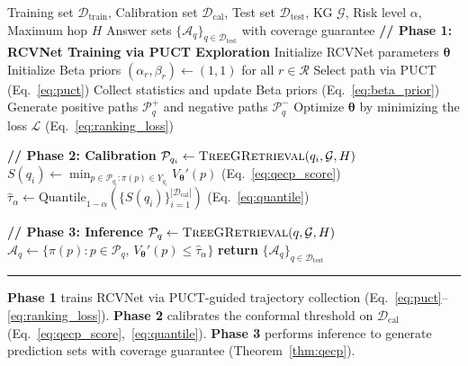 \documentclass{article}
\theoremstyle{plain}
\theoremstyle{definition}
\theoremstyle{remark}
\begin{document}
\begin{algorithm}[h]
\caption{Conformal Path Reasoning (CPR)}
\label{alg:cpr}
\begin{algorithmic}[1]
\renewcommand{\algorithmicrequire}{\textbf{Input:}} 
\renewcommand{\algorithmicensure}{\textbf{Output:}} 
\REQUIRE Training set $\mathcal{D}_{\text{train}}$, Calibration set $\mathcal{D}_{\text{cal}}$, Test set $\mathcal{D}_{\text{test}}$, 
KG $\mathcal{G}$,
Risk level $\alpha$, Maximum hop $H$
\ENSURE Answer sets $\{\mathcal{A}_q\}_{q \in \mathcal{D}_{\text{test}}}$ with coverage guarantee
\textbf{// Phase 1: RCVNet Training via PUCT Exploration}
\STATE Initialize RCVNet parameters $\bm{\theta}$
\STATE Initialize Beta priors $(\alpha_r, \beta_r) \gets (1, 1)$ for all $r \in \mathcal{R}$
        \STATE Select path via PUCT (Eq.~\ref{eq:puct})
        \STATE Collect statistics and update Beta priors (Eq.~\ref{eq:beta_prior})
    \ENDFOR
    \STATE Generate positive paths $\mathcal{P}^+_q$ and negative paths $\mathcal{P}^-_q$
\ENDFOR
\STATE Optimize $\bm\theta$ by minimizing the loss $\mathcal{L}$ (Eq.~\ref{eq:ranking_loss})

\textbf{// Phase 2: Calibration}
    \STATE $\mathcal{P}_{q_i} \gets \textsc{TreeGRetrieval}(q_i, \mathcal{G}, H)$
    \STATE $S(q_i) \gets \min_{p \in \mathcal{P}_{q_i} : \pi(p) \in Y_{q_i}} V_{\bm\theta}'(p)$ (Eq.~\ref{eq:qecp_score})
\ENDFOR
\STATE $\hat{\tau}_\alpha \gets \text{Quantile}_{1-\alpha}\left(\{S(q_i)\}_{i=1}^{|\mathcal{D}_{\text{cal}}|}\right)$ (Eq.~\ref{eq:quantile})

\textbf{// Phase 3: Inference}
    \STATE $\mathcal{P}_{q} \gets \textsc{TreeGRetrieval}(q, \mathcal{G}, H)$
    \STATE $\mathcal{A}_q \gets \{\pi(p) : p \in \mathcal{P}_q,\, V_{\bm\theta}'(p) \le \hat{\tau}_\alpha\}$
\ENDFOR
\STATE \textbf{return} $\{\mathcal{A}_q\}_{q \in \mathcal{D}_{\text{test}}}$
\end{algorithmic}
\vspace{0.3em}
\hrule
\vspace{0.3em}
\small
\textbf{Phase 1} trains RCVNet via PUCT-guided trajectory collection (Eq.~\ref{eq:puct}--\ref{eq:ranking_loss}). 
\textbf{Phase 2} calibrates the conformal threshold on $\mathcal{D}_{\text{cal}}$ (Eq.~\ref{eq:qecp_score},~\ref{eq:quantile}). 
\textbf{Phase 3} performs inference to generate prediction sets with coverage guarantee (Theorem~\ref{thm:qecp}).
\end{algorithm}
\vspace{-8pt}
\end{document}
